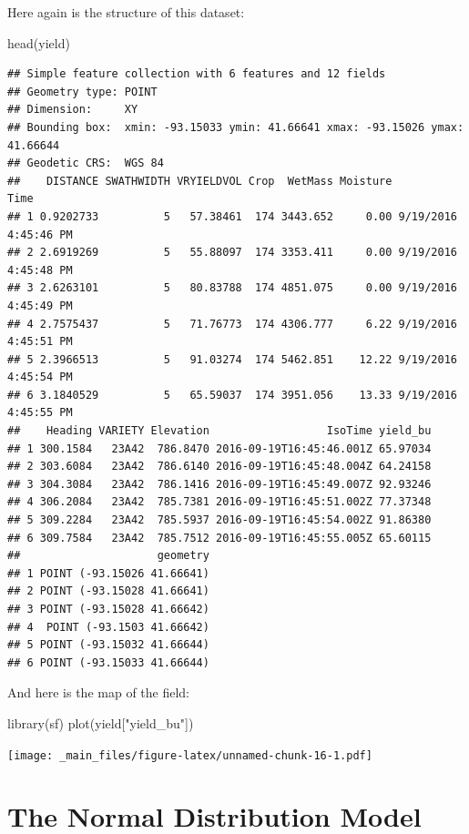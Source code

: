 \documentclass[
]{book}
\newenvironment{Shaded}{\begin{snugshade}}{\end{snugshade}}
\newcommand{\FunctionTok}[1]{\textcolor[rgb]{0.00,0.00,0.00}{#1}}
\newcommand{\NormalTok}[1]{#1}
\newcommand{\StringTok}[1]{\textcolor[rgb]{0.31,0.60,0.02}{#1}}
\begin{document}
Here again is the structure of this dataset:

\begin{Shaded}
\begin{Highlighting}[]
\FunctionTok{head}\NormalTok{(yield)}
\end{Highlighting}
\end{Shaded}

\begin{verbatim}
## Simple feature collection with 6 features and 12 fields
## Geometry type: POINT
## Dimension:     XY
## Bounding box:  xmin: -93.15033 ymin: 41.66641 xmax: -93.15026 ymax: 41.66644
## Geodetic CRS:  WGS 84
##    DISTANCE SWATHWIDTH VRYIELDVOL Crop  WetMass Moisture                 Time
## 1 0.9202733          5   57.38461  174 3443.652     0.00 9/19/2016 4:45:46 PM
## 2 2.6919269          5   55.88097  174 3353.411     0.00 9/19/2016 4:45:48 PM
## 3 2.6263101          5   80.83788  174 4851.075     0.00 9/19/2016 4:45:49 PM
## 4 2.7575437          5   71.76773  174 4306.777     6.22 9/19/2016 4:45:51 PM
## 5 2.3966513          5   91.03274  174 5462.851    12.22 9/19/2016 4:45:54 PM
## 6 3.1840529          5   65.59037  174 3951.056    13.33 9/19/2016 4:45:55 PM
##    Heading VARIETY Elevation                  IsoTime yield_bu
## 1 300.1584   23A42  786.8470 2016-09-19T16:45:46.001Z 65.97034
## 2 303.6084   23A42  786.6140 2016-09-19T16:45:48.004Z 64.24158
## 3 304.3084   23A42  786.1416 2016-09-19T16:45:49.007Z 92.93246
## 4 306.2084   23A42  785.7381 2016-09-19T16:45:51.002Z 77.37348
## 5 309.2284   23A42  785.5937 2016-09-19T16:45:54.002Z 91.86380
## 6 309.7584   23A42  785.7512 2016-09-19T16:45:55.005Z 65.60115
##                     geometry
## 1 POINT (-93.15026 41.66641)
## 2 POINT (-93.15028 41.66641)
## 3 POINT (-93.15028 41.66642)
## 4  POINT (-93.1503 41.66642)
## 5 POINT (-93.15032 41.66644)
## 6 POINT (-93.15033 41.66644)
\end{verbatim}

And here is the map of the field:

\begin{Shaded}
\begin{Highlighting}[]
\FunctionTok{library}\NormalTok{(sf)}
\FunctionTok{plot}\NormalTok{(yield[}\StringTok{"yield\_bu"}\NormalTok{])}
\end{Highlighting}
\end{Shaded}

\texttt{[image: \_main\_files/figure-latex/unnamed-chunk-16-1.pdf]}

\hypertarget{the-normal-distribution-model}{%
\section{The Normal Distribution Model}\label{the-normal-distribution-model}}
\end{document}

